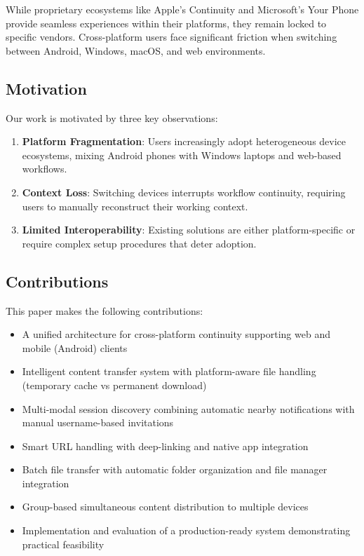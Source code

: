\documentclass[conference]{IEEEtran}
\begin{document}
While proprietary ecosystems like Apple's Continuity \cite{apple_continuity} and Microsoft's Your Phone \cite{microsoft_yourphone} provide seamless experiences within their platforms, they remain locked to specific vendors. Cross-platform users face significant friction when switching between Android, Windows, macOS, and web environments.

\subsection{Motivation}

Our work is motivated by three key observations:

\begin{enumerate}
    \item \textbf{Platform Fragmentation}: Users increasingly adopt heterogeneous device ecosystems, mixing Android phones with Windows laptops and web-based workflows.
    \item \textbf{Context Loss}: Switching devices interrupts workflow continuity, requiring users to manually reconstruct their working context.
    \item \textbf{Limited Interoperability}: Existing solutions are either platform-specific or require complex setup procedures that deter adoption.
\end{enumerate}

\subsection{Contributions}

This paper makes the following contributions:

\begin{itemize}
    \item A unified architecture for cross-platform continuity supporting web and mobile (Android) clients
    \item Intelligent content transfer system with platform-aware file handling (temporary cache vs permanent download)
    \item Multi-modal session discovery combining automatic nearby notifications with manual username-based invitations
    \item Smart URL handling with deep-linking and native app integration
    \item Batch file transfer with automatic folder organization and file manager integration
    \item Group-based simultaneous content distribution to multiple devices
    \item Implementation and evaluation of a production-ready system demonstrating practical feasibility
\end{itemize}
\end{document}
